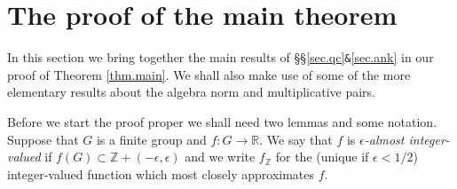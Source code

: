 \documentclass[12pt]{amsart}
\numberwithin{equation}{section}
\theoremstyle{plain}
\theoremstyle{definition}
\newcommand{\Z}{\mathbb{Z}}
\newcommand{\R}{\mathbb{R}}
\begin{document}
\section{The proof of the main theorem}\label{sec.pmt}

In this section we bring together the main results of \S\S\ref{sec.qc}\verb!&!\ref{sec.ank} in our proof of Theorem \ref{thm.main}.  We shall also make use of some of the more elementary results about the algebra norm and multiplicative pairs.

Before we start the proof proper we shall need two lemmas and some notation.  Suppose that $G$ is a finite group and $f:G \rightarrow \R$.  We say that $f$ is \emph{$\epsilon$-almost integer-valued} if $f(G) \subset \Z+(-\epsilon,\epsilon)$ and we write $f_{\Z}$ for the (unique if $\epsilon<1/2$) integer-valued function which most closely approximates $f$.
\end{document}
